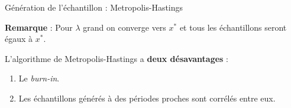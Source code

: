 \documentclass[10pt,xcolor=table,color={dvipsnames,usenames},ignorenonframetext,usepdftitle=false,french]{beamer}
\begin{document}
\begin{frame}{Génération de l'échantillon : Metropolis-Hastings}
\protect\hypertarget{guxe9nuxe9ration-de-luxe9chantillon-metropolis-hastings-1}{}

\textbf{Remarque} : Pour \(\lambda\) grand on converge vers \(x^*\) et
tous les échantillons seront égaux à \(x^*\).

\bigskip
\bigskip

\pause

\bctakecare L'algorithme de Metropolis-Hastings a
\textbf{deux désavantages} :

\begin{enumerate}
\item Le \emph{burn-in}.
\item Les échantillons générés à des périodes proches sont corrélés entre eux. 
\end{enumerate}

\end{frame}
\end{document}

